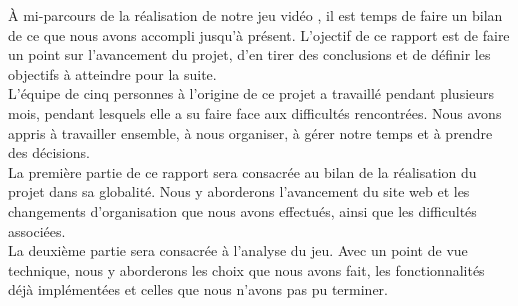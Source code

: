 
À mi-parcours de la réalisation de notre jeu vidéo \gameName, il est temps de faire un bilan de ce que nous avons accompli jusqu'à présent.
L'ojectif de ce rapport est de faire un point sur l'avancement du projet, d'en tirer des conclusions et de définir les objectifs à atteindre pour la suite.
\\

L'équipe de cinq personnes à l'origine de ce projet a travaillé pendant plusieurs mois, pendant lesquels elle a su faire face aux difficultés rencontrées. 
Nous avons appris à travailler ensemble, à nous organiser, à gérer notre temps et à prendre des décisions. 
\\

La première partie de ce rapport sera consacrée au bilan de la réalisation du projet dans sa globalité. 
Nous y aborderons l'avancement du site web et les changements d'organisation que nous avons effectués, ainsi que les difficultés associées.
\\

La deuxième partie sera consacrée à l'analyse du jeu. 
Avec un point de vue technique, nous y aborderons les choix que nous avons fait, les fonctionnalités déjà implémentées et celles que nous n'avons pas pu terminer.
\\

